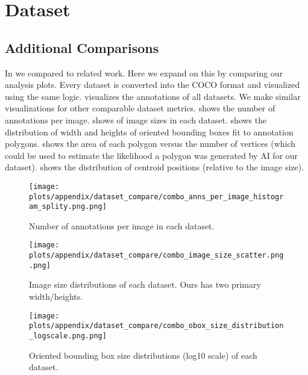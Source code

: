 \appendix

\section{Dataset}

\subsection{Additional Comparisons}
\label{sec:expanded_relatedwork}

In  we compared to related work. Here we expand on this
by comparing our analysis plots. Every dataset is converted into the COCO
format and visualized using the same logic. 
visualizes the annotations of all datasets. We make similar visualizations 
for other comparable dataset metrics.
 shows the number of annotations per image.
 shows of image sizes in each dataset.
 shows the distribution of width and heights of oriented bounding boxes fit to annotation polygons.
 shows the area of each polygon versus the number of vertices (which could be used to estimate the likelihood a polygon was generated by AI for our dataset).
 shows the distribution of centroid positions (relative to the image size).


\begin{figure*}[ht]
\centering
\texttt{[image: plots/appendix/dataset\_compare/combo\_anns\_per\_image\_histogram\_splity.png.png]}
\caption[]{
    Number of annotations per image in each dataset.
}
\label{fig:combo_anns_per_image_histogram_splity}
\end{figure*}


\begin{figure*}[ht]
\centering
\texttt{[image: plots/appendix/dataset\_compare/combo\_image\_size\_scatter.png.png]}
\caption[]{
    Image size distributions of each dataset. 
    Ours has two primary width/heights.
}
\label{fig:combo_image_size_scatter}
\end{figure*}


\begin{figure*}[ht]
\centering
\texttt{[image: plots/appendix/dataset\_compare/combo\_obox\_size\_distribution\_logscale.png.png]}
\caption[]{
    Oriented bounding box size distributions (log10 scale) of each dataset.
}
\label{fig:combo_obox_size_distribution_logscale}
\end{figure*}

